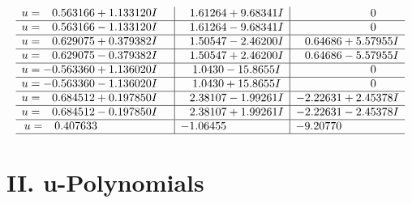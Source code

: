\documentclass[1p]{elsarticle_modified}
\theoremstyle{definition}
\begin{document}
$$\begin{array}{c|c|c}
\begin{aligned}
u &= \phantom{-}0.563166 + 1.133120 I\end{aligned}
 & \phantom{-}1.61264 + 9.68341 I & \phantom{-0.000000 } 0 \\ \hline\begin{aligned}
u &= \phantom{-}0.563166 - 1.133120 I\end{aligned}
 & \phantom{-}1.61264 - 9.68341 I & \phantom{-0.000000 } 0 \\ \hline\begin{aligned}
u &= \phantom{-}0.629075 + 0.379382 I\end{aligned}
 & \phantom{-}1.50547 - 2.46200 I & \phantom{-}0.64686 + 5.57955 I \\ \hline\begin{aligned}
u &= \phantom{-}0.629075 - 0.379382 I\end{aligned}
 & \phantom{-}1.50547 + 2.46200 I & \phantom{-}0.64686 - 5.57955 I \\ \hline\begin{aligned}
u &= -0.563360 + 1.136020 I\end{aligned}
 & \phantom{-}1.0430 - 15.8655 I & \phantom{-0.000000 } 0 \\ \hline\begin{aligned}
u &= -0.563360 - 1.136020 I\end{aligned}
 & \phantom{-}1.0430 + 15.8655 I & \phantom{-0.000000 } 0 \\ \hline\begin{aligned}
u &= \phantom{-}0.684512 + 0.197850 I\end{aligned}
 & \phantom{-}2.38107 - 1.99261 I & -2.22631 + 2.45378 I \\ \hline\begin{aligned}
u &= \phantom{-}0.684512 - 0.197850 I\end{aligned}
 & \phantom{-}2.38107 + 1.99261 I & -2.22631 - 2.45378 I \\ \hline\begin{aligned}
u &= \phantom{-}0.407633\phantom{ +0.000000I}\end{aligned}
 & -1.06455\phantom{ +0.000000I} & -9.20770\phantom{ +0.000000I}\\
 \hline 
 \end{array}$$\newpage
\newpage\renewcommand{\arraystretch}{1}
\centering \section*{ II. u-Polynomials}
\end{document}
